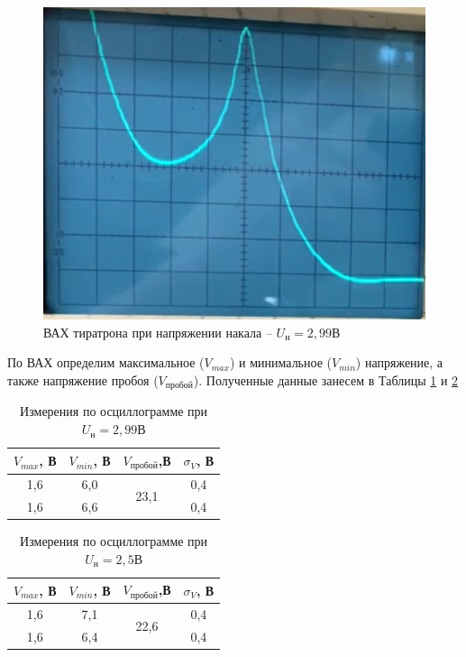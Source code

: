 \documentclass[a4paper,12pt]{article}
\begin{document}
\begin{figure}[h!]
	\centering
	\includegraphics[scale=0.9]{fig3}
	\caption{ВАХ тиратрона при напряжении накала -- $U_н = 2,99 В$}
	\label{fig3:Osc_2}
\end{figure}

По ВАХ определим максимальное ($V_{max}$) и минимальное ($V_{min}$) напряжение, а также напряжение пробоя ($V_{пробой}$). Полученные данные занесем в Таблицы \ref{table1:voltage1} и \ref{table2:voltage2}

\begin{table}[h]
\centering
\caption{Измерения по осциллограмме при $U_н = 2,99В$}
\label{table1:voltage1}
\begin{tabular}{|c|c|c|c|}
\hline
\textbf{$V_{max}$, В} & \textbf{$V_{min}$, В} & \textbf{$V_{пробой}$,В} & \textbf{$\sigma_V$, В} \\ \hline
1,6 & 6,0 & \multirow{2}{*}{23,1} & 0,4 \\ \cline{1-2} \cline{4-4} 
1,6 & 6,6 &  & 0,4 \\ \hline
\end{tabular}
\end{table}

\begin{table}[h]
\centering
\caption{Измерения по осциллограмме при $U_н = 2,5В$}
\label{table2:voltage2}
\begin{tabular}{|c|c|c|c|}
\hline
\textbf{$V_{max}$, В} & \textbf{$V_{min}$, В} & \textbf{$V_{пробой}$,В} & \textbf{$\sigma_V$, В} \\ \hline
1,6 & 7,1 & \multirow{2}{*}{22,6} & 0,4 \\ \cline{1-2} \cline{4-4} 
1,6 & 6,4 &  & 0,4 \\ \hline
\end{tabular}
\end{table}
\end{document}
